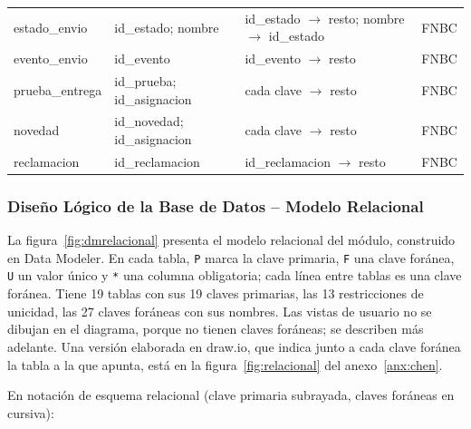 {\begin{longtable}{L{3.6cm} L{3.8cm} L{5.4cm} L{1.2cm}}
estado\_envio & id\_estado; nombre & id\_estado $\rightarrow$ resto; nombre $\rightarrow$ id\_estado & FNBC \\
evento\_envio & id\_evento & id\_evento $\rightarrow$ resto & FNBC \\
prueba\_entrega & id\_prueba; id\_asignacion & cada clave $\rightarrow$ resto & FNBC \\
novedad & id\_novedad; id\_asignacion & cada clave $\rightarrow$ resto & FNBC \\
reclamacion & id\_reclamacion & id\_reclamacion $\rightarrow$ resto & FNBC \\
\end{longtable}
\par}

\subsubsection{Diseño Lógico de la Base de Datos -- Modelo Relacional}
\label{sec:esquemarel}

La figura~\ref{fig:dmrelacional} presenta el modelo relacional del
módulo, construido en Data Modeler. En cada tabla,
\texttt{P} marca la clave primaria, \texttt{F} una clave foránea,
\texttt{U} un valor único y \texttt{*} una columna obligatoria; cada
línea entre tablas es una clave foránea. Tiene 19 tablas con sus 19 claves
primarias, las 13 restricciones de unicidad, las 27 claves foráneas con
sus nombres. Las vistas de usuario no se dibujan en el diagrama, porque no
tienen claves foráneas; se describen más adelante. Una versión elaborada en draw.io, que indica
junto a cada clave foránea la tabla a la que apunta, está en la
figura~\ref{fig:relacional} del anexo~\ref{anx:chen}.


En notación de esquema relacional (clave primaria subrayada, claves
foráneas en cursiva):

